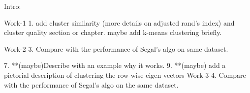Intro:

Work-1
1. add cluster similarity (more details on adjusted rand's index) and cluster quality section or chapter. maybe add k-means clustering briefly.

Work-2
3. Compare with the performance of Segal's algo on same dataset.

7. **(maybe)Describe with an example why it works.
9. **(maybe) add a pictorial description of clustering the row-wise eigen vectors
Work-3
4. Compare with the performance of Segal's algo on the same dataset.



